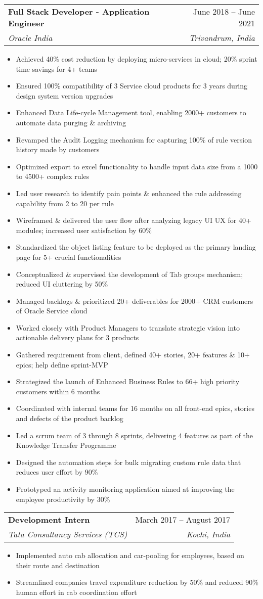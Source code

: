 \documentclass[letterpaper,10pt]{article}
\makeatletter
\newcommand{\resumeItem}[1]{
  \item\small{
    {#1 \vspace{-2pt}}
  }
}
\newcommand{\resumeSubheading}[4]{
  \vspace{-2pt}\item
    \begin{tabular*}{0.97\textwidth}[t]{l@{\extracolsep{\fill}}r}
      \textbf{#1} & #2 \\
      \textit{\small#3} & \textit{\small #4} \\
    \end{tabular*}\vspace{-7pt}
}
\newcommand{\resumeItemListStart}{\begin{itemize}}
\newcommand{\resumeItemListEnd}{\end{itemize}\vspace{-5pt}}
\makeatother
\begin{document}
    \resumeSubheading
      {Full Stack Developer - Application Engineer}{June 2018 -- June 2021}
      {Oracle India}{Trivandrum, India}
      \resumeItemListStart
        	\resumeItem{Achieved 40\% cost reduction by deploying micro-services in cloud; 20\% sprint time savings for 4+ teams}
        	\resumeItem{Ensured 100\% compatibility of 3 Service cloud products for 3 years during design system version upgrades}
        	\resumeItem{Enhanced Data Life-cycle Management tool, enabling 2000+ customers to automate data purging \& archiving}
	\resumeItem{Revamped the Audit Logging mechanism for capturing 100\% of rule version history made by customers}
	\resumeItem{Optimized export to excel functionality to handle input data size from a 1000 to 4500+ complex rules}
	\resumeItem{Led user research to identify pain points \& enhanced the rule addressing capability from 2 to 20 per rule}
	\resumeItem{Wireframed \& delivered the user flow after analyzing legacy UI UX for 40+ modules; increased user satisfaction by 60\%}
	\resumeItem{Standardized the object listing feature to be deployed as the primary landing page for 5+ crucial functionalities}
	\resumeItem{Conceptualized \& supervised the development of Tab groups mechanism; reduced UI cluttering by 50\%}
\resumeItem{Managed backlogs \& prioritized 20+ deliverables for 2000+ CRM customers of Oracle Service cloud}
	\resumeItem{Worked closely with Product Managers to translate strategic vision into actionable delivery plans for 3 products}
	\resumeItem{Gathered requirement from client, defined 40+ stories, 20+ features \& 10+ epics; help define sprint-MVP}
	\resumeItem{Strategized the launch of Enhanced Business Rules to 66+ high priority customers within 6 months}
	\resumeItem{Coordinated with internal teams for 16 months on all front-end epics, stories and defects of the product backlog}
	\resumeItem{Led a scrum team of 3 through 8 sprints, delivering 4 features as part of the Knowledge Transfer Programme}
	\resumeItem{Designed the automation steps for bulk migrating custom rule data that reduces user effort by 90\%}
	\resumeItem{Prototyped an activity monitoring application aimed at improving the employee productivity by 30\%}



    \resumeItemListEnd

    \resumeSubheading
      {Development Intern}{March 2017 -- August 2017}
      {Tata Consultancy Services (TCS)}{Kochi, India}
      \resumeItemListStart
        \resumeItem{Implemented auto cab allocation and car-pooling for employees, based on their route and destination} 
\resumeItem{Streamlined companies travel expenditure reduction by 50\% and reduced 90\% human effort in cab coordination effort}
      \resumeItemListEnd
\end{document}
